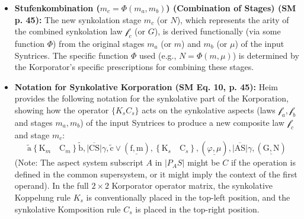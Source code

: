 \documentclass[12pt]{article}
\newcommand{\synkolator}{\mathcal{f}}
\newcommand{\synkolationsstufe}{m}
\newcommand{\aspektivsystem}{P}
\newcommand{\subjektiveraspekt}{S}
\begin{document}
\begin{itemize}
\begin{enumerate}
\begin{itemize}
            \item \textbf{Stufenkombination (\( \synkolationsstufe_c = \Phi(\synkolationsstufe_a,\synkolationsstufe_b) \)) (Combination of Stages) (SM p. 45):} The new synkolation stage \( \synkolationsstufe_c \) (or \(N\)), which represents the arity of the combined synkolation law \( \synkolator_c \) (or \(G\)), is derived functionally (via some function \( \Phi \)) from the original stages \( \synkolationsstufe_a \) (or \(m\)) and \( \synkolationsstufe_b \) (or \(\mu\)) of the input Syntrices. The specific function \( \Phi \) used (e.g., \( N = \Phi(m,\mu) \)) is determined by the Korporator's specific prescriptions for combining these stages.
            \item \textbf{Notation for Synkolative Korporation (SM Eq. 10, p. 45):}
            Heim provides the following notation for the synkolative part of the Korporation, showing how the operator \( \{K_s C_s\} \) acts on the synkolative aspects (laws \( \synkolator_a, \synkolator_b \) and stages \( \synkolationsstufe_a, \synkolationsstufe_b \)) of the input Syntrices to produce a new composite law \( \synkolator_c \) and stage \( \synkolationsstufe_c \):
            \begin{equation}
\tilde{\mathrm{a}} \left\{ \mathrm{K}_m \quad \mathrm{C}_m \right\} \tilde{\mathrm{b}}, \overline{|\mathrm{CS}|}\gamma, \tilde{\mathrm{c}} \lor (\underline{\mathrm{f}, \mathrm{m}}), \left\{ \mathrm{K}_s \quad \mathrm{C}_s \right\}, (\underline{\varphi, \mu}), \overline{|\mathrm{AS}|}\gamma, (\underline{\mathrm{G}, \mathrm{N}})
\label{eq:original_synkolative_korporation}
\end{equation}
            (Note: The aspect system subscript \(A\) in \(|\aspektivsystem_A \subjektiveraspekt|\) might be \(C\) if the operation is defined in the common supersystem, or it might imply the context of the first operand). In the full \( 2 \times 2 \) Korporator operator matrix, the synkolative Koppelung rule \( K_s \) is conventionally placed in the top-left position, and the synkolative Komposition rule \( C_s \) is placed in the top-right position.
        \end{itemize}
    \end{enumerate}


\end{itemize}
\end{document}
